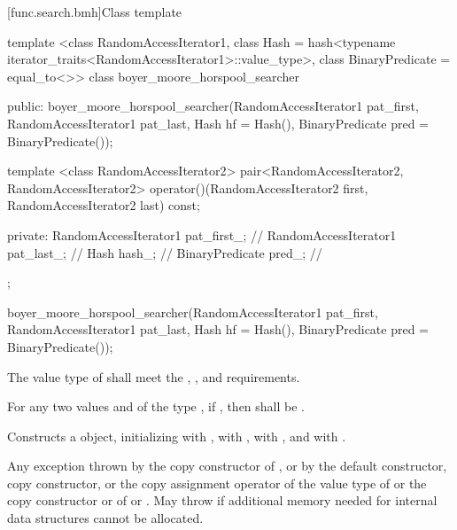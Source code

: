 [func.search.bmh]{Class template }

%
\begin{codeblock}
template <class RandomAccessIterator1,
          class Hash = hash<typename iterator_traits<RandomAccessIterator1>::value_type>,
          class BinaryPredicate = equal_to<>>
  class boyer_moore_horspool_searcher {
  public:
    boyer_moore_horspool_searcher(RandomAccessIterator1 pat_first,
                                  RandomAccessIterator1 pat_last,
                                  Hash hf = Hash(),
                                  BinaryPredicate pred = BinaryPredicate());

    template <class RandomAccessIterator2>
      pair<RandomAccessIterator2, RandomAccessIterator2>
        operator()(RandomAccessIterator2 first, RandomAccessIterator2 last) const;

  private:
    RandomAccessIterator1 pat_first_;   // \expos
    RandomAccessIterator1 pat_last_;    // \expos
    Hash hash_;                         // \expos
    BinaryPredicate pred_;              // \expos
  };
\end{codeblock}

%
\begin{itemdecl}
boyer_moore_horspool_searcher(RandomAccessIterator1 pat_first,
                              RandomAccessIterator1 pat_last,
                              Hash hf = Hash(),
                              BinaryPredicate pred = BinaryPredicate());
\end{itemdecl}

\begin{itemdescr}
\pnum
\requires
The value type of  shall meet the ,
, and  requirements.

\pnum
\requires
For any two values  and  of the type ,
if , then  shall be .

\pnum
\effects
Constructs a  object, initializing  with ,
 with ,  with , and  with .

\pnum
\throws
Any exception thrown by the copy constructor of ,
or by the default constructor, copy constructor, or the copy assignment operator of the value type of 
or the copy constructor or  of  or .
May throw  if additional memory needed for internal data structures cannot be allocated.
\end{itemdescr}

